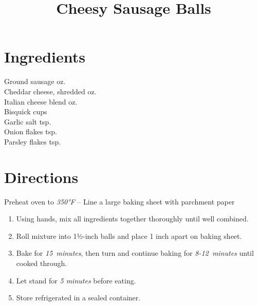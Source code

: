 \documentclass[11pt,letterpaper]{article}
\title{Cheesy Sausage Balls}
\author{}
\date{}
\begin{document}
\maketitle
\thispagestyle{empty}

\section*{Ingredients}
\setlength{\columnsep}{20pt}
\begin{multicols}{2}
\noindent
    Ground sausage  oz. \\
    Cheddar cheese, shredded  oz. \\
    Italian cheese blend  oz. \\
    Bisquick  cups \\
    Garlic salt  tsp. \\
    Onion flakes  tsp. \\
    Parsley flakes  tsp.
\end{multicols}

\section*{Directions}

\noindent
Preheat oven to \textit{350°F} --
Line a large baking sheet with parchment paper

\begin{enumerate}
    \item Using hands, mix all ingredients together thoroughly until well combined.
    \item Roll mixture into 1½-inch balls and place 1 inch apart on baking sheet.
    \item Bake for \textit{15~minutes}, then turn and continue baking for \textit{8-12~minutes} until cooked through.
    \item Let stand for \textit{5 minutes} before eating.
    \item Store refrigerated in a sealed container.
\end{enumerate}
\end{document}
